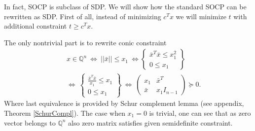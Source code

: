 \documentclass[12pt]{book}
\theoremstyle{definition}
\begin{document}
In fact, SOCP is subclass of SDP. We will show how the standard SOCP can be rewritten as SDP.
First of all, instead of minimizing $c^Tx$ we will minimize $t$ with additional constraint $t\geq c^Tx$. 

The only nontrivial part is to rewrite conic constraint 
\begin{eqnarray}
& &x\in \mathbb{Q}^n \ \Leftrightarrow  \ ||\bar{x}||\leq x_1 \ \Leftrightarrow  
\left\lbrace \begin{array}{r}
\bar{x}^T\bar{x}\leq x_1^2\\
0\leq x_1 
\end{array}\right\rbrace \\
 & &\Leftrightarrow \ 
 \left\lbrace \begin{array}{r}
\frac{\bar{x}^T\bar{x}}{x_1}\leq x_1\\
0\leq x_1 
\end{array}\right\rbrace 
 \ \Leftrightarrow  \ 
 \left( \begin{array}{cc}
x_1 & \bar{x}^T\\
\bar{x} & x_1I_{n-1}
\end{array}\right)\succeq 0.
\label{arrowx}
\end{eqnarray}
Where last equivalence is provided by Schur complement lemma (see appendix, Theorem \ref{SchurCompl}). The case when $x_1=0$ is trivial, one can see that as zero vector belongs to $\mathbb{Q}^n$ also zero matrix satisfies given semidefinite constraint. 
\end{document}
